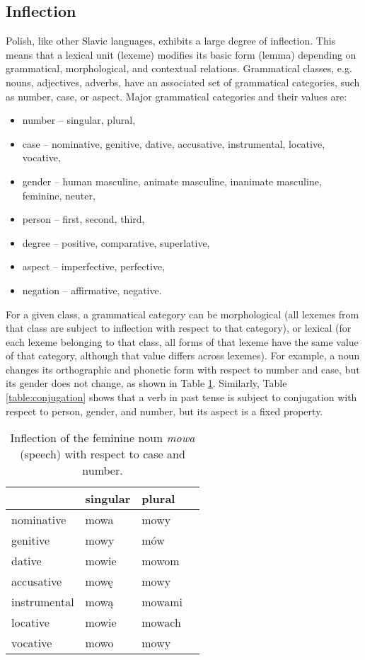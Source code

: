 \subsection{Inflection}
\label{subsection:inflection}
Polish, like other Slavic languages, exhibits a large degree of inflection. This means that a lexical unit (lexeme) modifies its basic form (lemma) depending on grammatical, morphological, and contextual relations. Grammatical classes, e.g. nouns, adjectives, adverbs, have an associated set of grammatical categories, such as number, case, or aspect. Major grammatical categories and their values are:

\begin{itemize}
\item number -- singular, plural,
\item case -- nominative, genitive, dative, accusative, instrumental, locative, vocative,
\item gender -- human masculine, animate masculine, inanimate masculine, feminine, neuter,
\item person -- first, second, third,
\item degree -- positive, comparative, superlative,
\item aspect -- imperfective, perfective,
\item negation -- affirmative, negative.
\end{itemize}
For a given class, a grammatical category can be morphological (all lexemes from that class are subject to inflection with respect to that category), or lexical (for each lexeme belonging to that class, all forms of that lexeme have the same value of that category, although that value differs across lexemes). For example, a noun changes its orthographic and phonetic form with respect to number and case, but its gender does not change, as shown in Table \ref{table:declination}. Similarly, Table \ref{table:conjugation} shows that a verb in past tense is subject to conjugation with respect to person, gender, and number, but its aspect is a fixed property.

\begin{table}[h!]
  \begin{center}
    \caption{Inflection of the feminine noun \textit{mowa} (speech) with respect to case and number.}
    \label{table:declination}
    \begin{tabular*}{.6\linewidth}{@{\extracolsep{\fill}}llll}
      & singular & plural \\
      \midrule
      nominative & mowa & mowy \\
      genitive & mowy & mów \\
      dative & mowie & mowom \\
      accusative & mowę & mowy \\
      instrumental & mową & mowami \\
      locative & mowie & mowach \\
      vocative & mowo & mowy \\
    \end{tabular*}
  \end{center}
\end{table}

